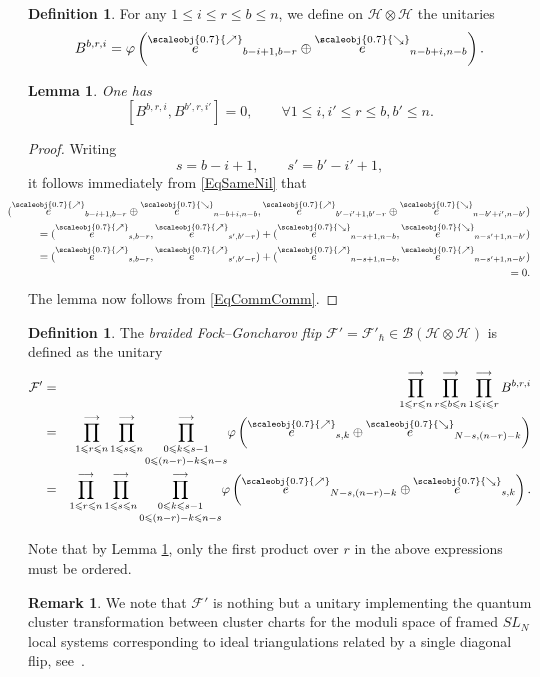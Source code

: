 \documentclass[11pt, reqno]{amsart}
\newtheorem{lemma}[theorem]{Lemma}
\theoremstyle{definition}
\newtheorem{defn}[theorem]{Definition}
\newtheorem{remark}[theorem]{Remark}
\numberwithin{equation}{section}
\def\beq{\begin{equation}}
\def\eeq{\end{equation}}
\def\longra{\longrightarrow}
\newcommand{\hr}[1]{\left(#1\right)}                                                    %
\newcommand{\hs}[1]{\left[#1\right]}                                                    %
\def\le{\leqslant}
\def\Fc{\mathcal F'}
\def\Hc{\mathcal H}
\newcommand{\Bc}{\mathcal{B}}
\newcommand{\nears}{\scaleobj{0.7}{\nearrow}}
\newcommand{\sears}{\scaleobj{0.7}{\searrow}}
\newcommand{\nee}{\overset{\nears}{e}}
\newcommand{\seee}{\overset{\sears}{e}}
\begin{document}
\begin{defn}
For any $1 \le i \le r \le b \le n$, we define on $\Hc \otimes \Hc$ the unitaries
\begin{equation}\label{DefBbri}
B^{b,r,i} 
 =  \varphi\hr{\nee_{b-i+1,b-r}\oplus \seee_{n-b+i,n-b}}.
\end{equation}
\end{defn}
\begin{lemma}\label{LemOrdering}
One has
\beq
\label{eq:comm-0}
\hs{B^{b,r,i}, B^{b',r,i'}} = 0, \qquad \forall 1 \le i,i' \le r \le b,b' \le n.
\eeq
\end{lemma}
\begin{proof}
Writing 
\[
s= b-i+1,\qquad s' = b'-i'+1,
\]
it follows immediately from \eqref{EqSameNil} that 
\begin{eqnarray*}
&& \hspace{-2cm} (\nee_{b-i+1,b-r}\oplus \seee_{n-b+i,n-b},\nee_{b'-i'+1,b'-r}\oplus \seee_{n-b'+i',n-b'})\\ 
&&= (\nee_{s,b-r},\nee_{s',b'-r}) + (\seee_{n-s+1,n-b},\seee_{n-s'+1,n-b'}) \\
&& =  (\nee_{s,b-r},\nee_{s',b'-r}) + (\nee_{n-s+1,n-b},\nee_{n-s'+1,n-b'}) \\
&& = 0.
\end{eqnarray*}
The lemma now follows from \eqref{EqCommComm}. 
\end{proof}

\begin{defn}
The \emph{braided Fock--Goncharov flip} $\Fc = \Fc_{\hbar} \in \Bc(\Hc\otimes \Hc)$ is defined as the unitary 
\begin{eqnarray}
\label{eq:F-1or}
\Fc &=& \prod_{1 \le r \le n}^{\longra} \prod_{r \le b \le n}^{\longra} \prod_{1 \le i \le r}^{\longra} B^{b,r,i}\\ 
&=& \label{eq:F-1or2} \prod_{1 \le r \le n}^{\longra} \prod_{1 \le s \le n}^{\longra} \underset{0\le (n-r)-k\le n-s}{\prod_{0 \le k \le s-1}^{\longra}}   \varphi\hr{\nee_{s,k}\oplus \seee_{N-s,(n-r)-k}}\\
&=& \label{eq:F-3or} \prod_{1 \le r \le n}^{\longra} \prod_{1 \le s \le n}^{\longra} \underset{0\le (n-r)-k\le n-s}{\prod_{0 \le k \le s-1}^{\longra}}   \varphi\hr{\nee_{N-s,(n-r)-k}\oplus \seee_{s,k}}.
\end{eqnarray}
\end{defn}
Note that by Lemma \ref{LemOrdering}, only the first product over $r$ in the above expressions must be ordered. 

\begin{remark}
   We note that $\Fc$ is nothing but a unitary implementing the quantum cluster transformation between cluster charts for the moduli space of framed $SL_N$ local systems corresponding to ideal triangulations related by a single diagonal flip, see~\cite[Section 10.3]{FG06}.
\end{remark}
\end{document}
